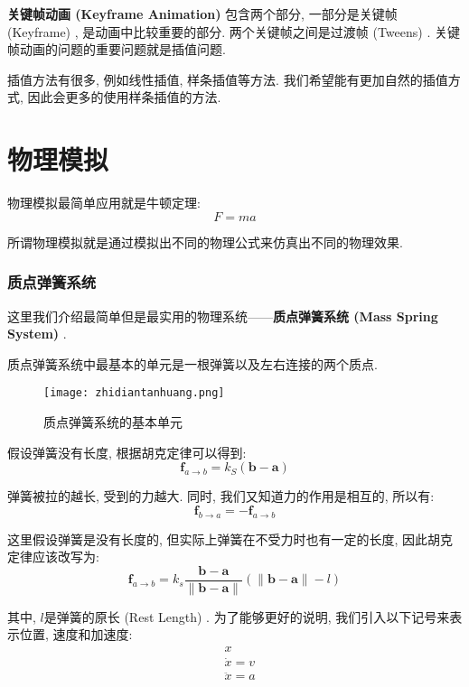 \textbf{关键帧动画 (Keyframe Animation) }包含两个部分, 一部分是关键帧 (Keyframe) , 是动画中比较重要的部分. 两个关键帧之间是过渡帧 (Tweens) . 关键帧动画的问题的重要问题就是插值问题. 

插值方法有很多, 例如线性插值, 样条插值等方法. 我们希望能有更加自然的插值方式, 因此会更多的使用样条插值的方法. 

\section{物理模拟}

物理模拟最简单应用就是牛顿定理: 
\begin{equation}
	F=ma
\end{equation}

所谓物理模拟就是通过模拟出不同的物理公式来仿真出不同的物理效果. 

\subsubsection{质点弹簧系统}

这里我们介绍最简单但是最实用的物理系统——\textbf{质点弹簧系统 (Mass Spring System) }. 

质点弹簧系统中最基本的单元是一根弹簧以及左右连接的两个质点. 

\begin{figure}[H]
	\centering
	\texttt{[image: zhidiantanhuang.png]}
	\caption{质点弹簧系统的基本单元}
	\label{fig:zdth}
\end{figure}

假设弹簧没有长度, 根据胡克定律可以得到: 
\begin{equation}
	\mathbf{f}_{a \rightarrow b}=k_{S}(\mathbf{b}-\mathbf{a})
\end{equation}

弹簧被拉的越长, 受到的力越大. 同时, 我们又知道力的作用是相互的, 所以有: 
\begin{equation}
	\mathbf{f}_{b \rightarrow a}=-\mathbf{f}_{a \rightarrow b}
\end{equation}

这里假设弹簧是没有长度的, 但实际上弹簧在不受力时也有一定的长度, 因此胡克定律应该改写为: 
\begin{equation}
	\mathbf{f}_{a \rightarrow b}=k_{s} \frac{\mathbf{b}-\mathbf{a}}{\|\mathbf{b}-\mathbf{a}\|}(\|\mathbf{b}-\mathbf{a}\|-l)
\end{equation}

其中, $l$是弹簧的原长 (Rest Length) . 为了能够更好的说明, 我们引入以下记号来表示位置, 速度和加速度: 
\begin{equation}
	\begin{split}
	&	x \\
	&	\dot{x}=v \\
	&	\ddot{x}=a
	\end{split}
\end{equation}

